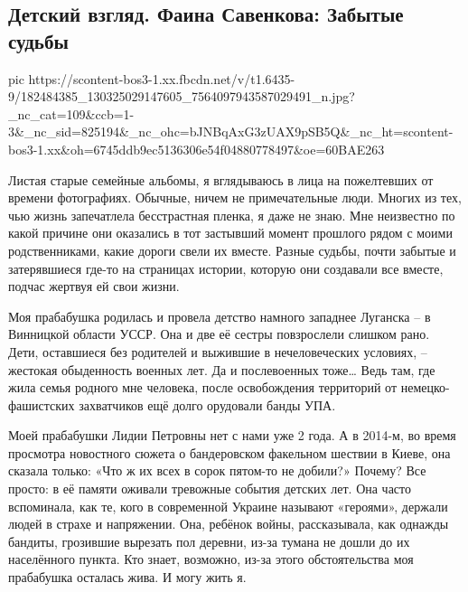  
 
 
 
 
\subsection{Детский взгляд. Фаина Савенкова:  Забытые судьбы}
\label{sec:06_05_2021.fb.respublikalnr.1.faina_savenkova_kiev_pamjat}

\ifcmt
  pic https://scontent-bos3-1.xx.fbcdn.net/v/t1.6435-9/182484385_130325029147605_7564097943587029491_n.jpg?_nc_cat=109&ccb=1-3&_nc_sid=825194&_nc_ohc=bJNBqAxG3zUAX9pSB5Q&_nc_ht=scontent-bos3-1.xx&oh=6745ddb9ec5136306e54f04880778497&oe=60BAE263
\fi

Листая старые семейные альбомы, я вглядываюсь в лица на пожелтевших от времени
фотографиях. Обычные, ничем не примечательные люди. Многих из тех, чью жизнь
запечатлела бесстрастная пленка, я даже не знаю. Мне неизвестно по какой
причине они оказались в тот застывший момент прошлого рядом с моими
родственниками, какие дороги свели их вместе. Разные судьбы, почти забытые и
затерявшиеся где-то на страницах истории, которую они создавали все вместе,
подчас жертвуя ей свои жизни.

Моя прабабушка родилась и провела детство намного западнее Луганска – в
Винницкой области УССР. Она и две её сестры повзрослели слишком рано. Дети,
оставшиеся без родителей и выжившие в нечеловеческих условиях, – жестокая
обыденность военных лет. Да и послевоенных тоже… Ведь там, где жила семья
родного мне человека, после освобождения территорий от немецко-фашистских
захватчиков ещё долго орудовали банды УПА. 

Моей прабабушки Лидии Петровны нет с нами уже 2 года. А в 2014-м, во время
просмотра новостного сюжета о бандеровском факельном шествии в Киеве, она
сказала только: «Что ж их всех в сорок пятом-то не добили?»  Почему? Все
просто: в её памяти оживали тревожные события детских лет. Она часто
вспоминала, как те, кого в современной Украине называют «героями», держали
людей в страхе и напряжении. Она, ребёнок войны, рассказывала, как однажды
бандиты, грозившие вырезать пол деревни, из-за тумана не дошли до их
населённого пункта. Кто знает, возможно, из-за этого обстоятельства моя
прабабушка осталась жива. И могу жить я.

